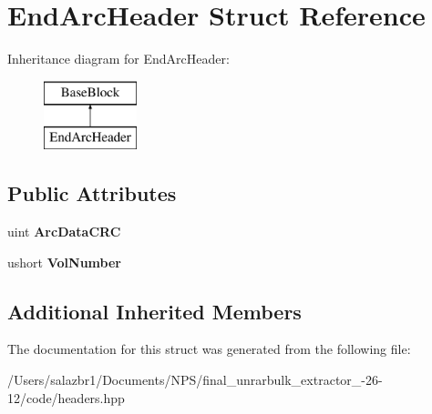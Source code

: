 \hypertarget{struct_end_arc_header}{\section{End\-Arc\-Header Struct Reference}
\label{struct_end_arc_header}
}
Inheritance diagram for End\-Arc\-Header\-:\begin{figure}[H]
\begin{center}
\leavevmode
\includegraphics[height=2.000000cm]{struct_end_arc_header}
\end{center}
\end{figure}
\subsection*{Public Attributes}
\begin{DoxyCompactItemize}
\item 
\hypertarget{struct_end_arc_header_a7312da8b7a708fe45b5ab6d13b631233}{uint {\bfseries Arc\-Data\-C\-R\-C}}\label{struct_end_arc_header_a7312da8b7a708fe45b5ab6d13b631233}

\item 
\hypertarget{struct_end_arc_header_a46ea67c6ccd96313761d9941b62e3899}{ushort {\bfseries Vol\-Number}}\label{struct_end_arc_header_a46ea67c6ccd96313761d9941b62e3899}

\end{DoxyCompactItemize}
\subsection*{Additional Inherited Members}


The documentation for this struct was generated from the following file\-:\begin{DoxyCompactItemize}
\item 
/\-Users/salazbr1/\-Documents/\-N\-P\-S/final\-\_\-unrarbulk\-\_\-extractor\-\_-\/26-\/12/code/headers.\-hpp\end{DoxyCompactItemize}
